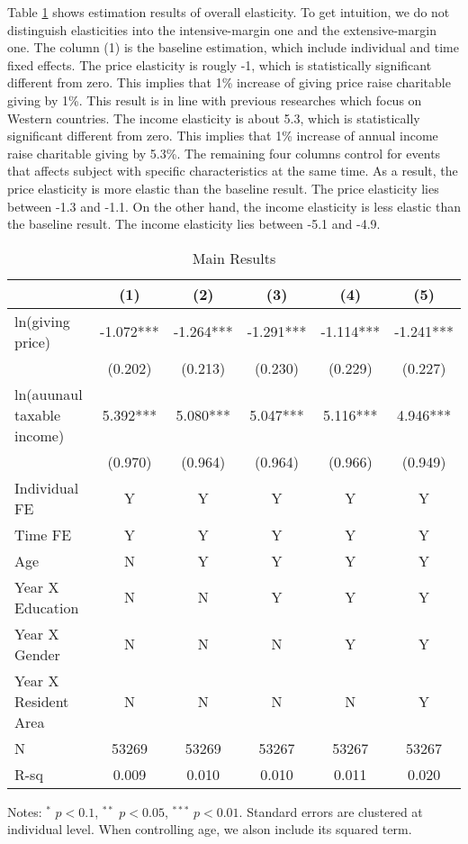 \documentclass[ review  , 3p ]{elsarticle}
\begin{document}
  Table \ref{tab:kableEstimateElasticityPart1} shows estimation results of overall elasticity.
  To get intuition, we do not distinguish elasticities into the intensive-margin one and the extensive-margin one.
  The column (1) is the baseline estimation, which include individual and time fixed effects.
  The price elasticity is rougly -1, which is statistically significant different from zero.
  This implies that 1\% increase of giving price raise charitable giving by 1\%.
  This result is in line with previous researches which focus on Western countries.
  The income elasticity is about 5.3, which is statistically significant different from zero.
  This implies that 1\% increase of annual income raise charitable giving by 5.3\%.
  The remaining four columns control for events that affects subject with specific characteristics at the same time.
  As a result, the price elasticity is more elastic than the baseline result.
  The price elasticity lies between -1.3 and -1.1.
  On the other hand, the income elasticity is less elastic than the baseline result.
  The income elasticity lies between -5.1 and -4.9.

  \begin{table}

  \caption{\label{tab:kableEstimateElasticityPart1}Main Results}
  \centering
  \fontsize{7}{9}\selectfont
  \begin{threeparttable}
  \begin{tabular}[t]{lccccc}
  \toprule
   & (1) & (2) & (3) & (4) & (5)\\
  \midrule
  ln(giving price) & -1.072*** & -1.264*** & -1.291*** & -1.114*** & -1.241***\\
   & (0.202) & (0.213) & (0.230) & (0.229) & (0.227)\\
  ln(auunaul taxable income) & 5.392*** & 5.080*** & 5.047*** & 5.116*** & 4.946***\\
   & (0.970) & (0.964) & (0.964) & (0.966) & (0.949)\\
  Individual FE & Y & Y & Y & Y & Y\\
  Time FE & Y & Y & Y & Y & Y\\
  Age & N & Y & Y & Y & Y\\
  Year X Education & N & N & Y & Y & Y\\
  Year X Gender & N & N & N & Y & Y\\
  Year X Resident Area & N & N & N & N & Y\\
  N & 53269 & 53269 & 53267 & 53267 & 53267\\
  R-sq & 0.009 & 0.010 & 0.010 & 0.011 & 0.020\\
  \bottomrule
  \end{tabular}
  \begin{tablenotes}
  \item Notes: $^{*}$ $p < 0.1$, $^{**}$ $p < 0.05$, $^{***}$ $p < 0.01$. Standard errors are clustered at individual level. When controlling age, we alson include its squared term.
  \end{tablenotes}
  \end{threeparttable}
  \end{table}
\end{document}
